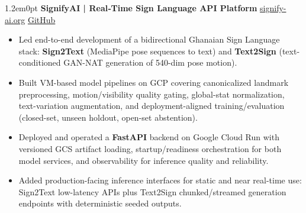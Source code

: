 \documentclass[a4paper,9pt]{extarticle}
\newenvironment{subs}
  {\begin{adjustwidth}{1.2em}{0pt}}
  {\end{adjustwidth}}
\begin{document}
\begin{subs}
    \textbf{SignifyAI | Real‑Time Sign Language API Platform} \hfill \small\href{https://www.signify-ai.org}{signify-ai.org} \textbar{} \href{https://github.com/zahemen9900/gsl-tests}{GitHub}
    \begin{itemize}
        \item Led end-to-end development of a bidirectional Ghanaian Sign Language stack: \textbf{Sign2Text} (MediaPipe pose sequences to text) and \textbf{Text2Sign} (text-conditioned GAN-NAT generation of 540-dim pose motion).
        \item Built VM-based model pipelines on GCP covering canonicalized landmark preprocessing, motion/visibility quality gating, global-stat normalization, text-variation augmentation, and deployment-aligned training/evaluation (closed-set, unseen holdout, open-set abstention).
        \item Deployed and operated a \textbf{FastAPI} backend on Google Cloud Run with versioned GCS artifact loading, startup/readiness orchestration for both model services, and observability for inference quality and reliability.
        \item Added production-facing inference interfaces for static and near real-time use: Sign2Text low-latency APIs plus Text2Sign chunked/streamed generation endpoints with deterministic seeded outputs.
    \end{itemize}

    \vspace{4pt}


\end{subs}
\end{document}
